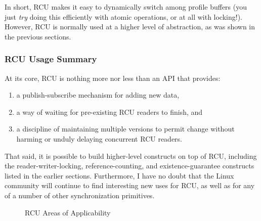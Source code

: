 In short, RCU makes it easy to dynamically switch among profile
buffers (you just \emph{try} doing this efficiently with atomic
operations, or at all with locking!).
However, RCU is normally used at a higher level of abstraction, as
was shown in the previous sections.

\subsubsection{RCU Usage Summary}
\label{sec:defer:RCU Usage Summary}

At its core, RCU is nothing more nor less than an API that provides:

\begin{enumerate}
\item	a publish-subscribe mechanism for adding new data,
\item	a way of waiting for pre-existing RCU readers to finish, and
\item	a discipline of maintaining multiple versions to permit change
	without harming or unduly delaying concurrent RCU readers.
\end{enumerate}

That said, it is possible to build higher-level constructs
on top of RCU, including the reader-writer-locking, reference-counting,
and existence-guarantee constructs listed in the earlier sections.
Furthermore, I have no doubt that the Linux community will continue to
find interesting new uses for RCU,
as well as for any of a number of other synchronization primitives.

\begin{figure}[tbh]
\centering
{}
\caption{RCU Areas of Applicability}
\label{fig:defer:RCU Areas of Applicability}
\end{figure}

